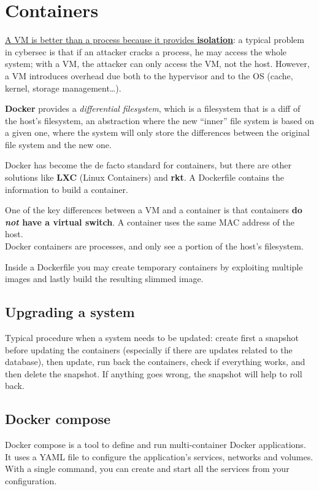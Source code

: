 \chapter{Containers}
\label{chap:containers}

\ul{A VM is better than a process because it provides \textbf{isolation}}:
a typical problem in cybersec is that if an attacker cracks a process, he may access the whole system;
with a VM, the attacker can only access the VM, not the host.
However, a VM introduces overhead due both to the hypervisor and to the OS (cache, kernel, storage management\dots).


\textbf{Docker} provides a \textit{differential filesystem}, which is a filesystem that is a diff of the host's filesystem, an abstraction where the new ``inner'' file system is based on a given one, where the system will only store the differences between the original file system and the new one.

Docker has become the de facto standard for containers, but there are other solutions like \textbf{LXC} (Linux Containers) and \textbf{rkt}.
A Dockerfile contains the information to build a container.

One of the key differences between a VM and a container is that containers \textbf{do \textit{not} have a virtual switch}.
A container uses the same MAC address of the host.\\
Docker containers are processes, and only see a portion of the host's filesystem.

Inside a Dockerfile you may create temporary containers by exploiting multiple images and lastly build the resulting slimmed image.

\section{Upgrading a system}

Typical procedure when a system needs to be updated: create first a snapshot before updating the containers (especially if there are updates related to the database), then update, run back the containers, check if everything works, and then delete the snapshot. If anything goes wrong, the snapshot will help to roll back.

\section{Docker compose}
Docker compose is a tool to define and run multi-container Docker applications. It uses a YAML file to configure the application's services, networks and volumes. With a single command, you can create and start all the services from your configuration.

